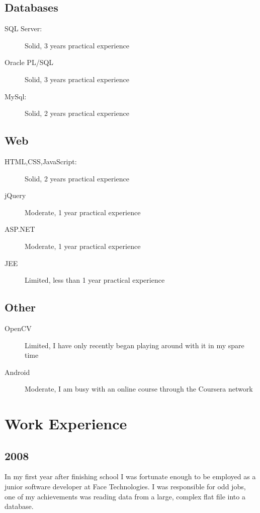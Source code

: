 \documentclass[a4paper]{article}
\begin{document}
	\subsection*{Databases}
		\begin{description}
			\item[SQL Server:]Solid, 3 years practical experience
			\item[Oracle PL/SQL]Solid, 3 years practical experience
			\item[MySql:]Solid, 2 years practical experience
		\end{description}
	\subsection*{Web}
		\begin{description}
			\item[HTML,CSS,JavaScript:]Solid, 2 years practical experience
			\item[jQuery]Moderate, 1 year practical experience
			\item[ASP.NET]Moderate, 1 year practical experience
			\item[JEE]Limited, less than 1 year practical experience
		\end{description}
	\subsection*{Other}
		\begin{description}
			\item[OpenCV]Limited, I have only recently began playing around with it in my spare time
			\item[Android]Moderate, I am busy with an online course through the Coursera network
		\end{description}
	


\section*{Work Experience}

	\subsection*{2008}
		In my first year after finishing school I was fortunate enough to be employed as a junior software developer at Face Technologies. 
		I was responsible for odd jobs, one of my achievements was reading data from a large, complex flat file into a database.
\end{document}

